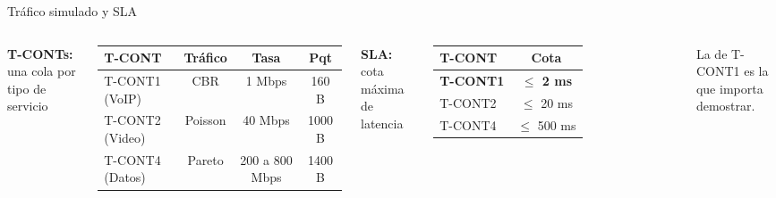 \documentclass[aspectratio=169,t]{beamer}
\begin{document}
\begin{frame}{Tráfico simulado y SLA}
    \begin{columns}[t]
        \textbf{T-CONTs:} una cola por tipo de servicio
        \vspace{0.2cm}
        \begin{table}
            \footnotesize
            \renewcommand{\arraystretch}{1.3}
            \begin{tabular}{lccc}
                \toprule
                T-CONT & Tráfico & Tasa & Pqt \\
                \midrule
                T-CONT1 (VoIP) & CBR & 1 Mbps & 160 B \\
                T-CONT2 (Video) & Poisson & 40 Mbps & 1000 B \\
                T-CONT4 (Datos) & Pareto & 200 a 800 Mbps & 1400 B \\
                \bottomrule
            \end{tabular}
        \end{table}
        \textbf{SLA:} cota máxima de latencia
        \vspace{0.2cm}
        \begin{table}
            \footnotesize
            \renewcommand{\arraystretch}{1.3}
            \begin{tabular}{lc}
                \toprule
                T-CONT & Cota \\
                \midrule
                \textbf{T-CONT1} & \textbf{$\leq$ 2 ms} \\
                T-CONT2 & $\leq$ 20 ms \\
                T-CONT4 & $\leq$ 500 ms \\
                \bottomrule
            \end{tabular}
        \end{table}
        \vspace{0.1cm}
        \footnotesize La de T-CONT1 es la que importa demostrar.
    \end{columns}
\end{frame}
\end{document}
